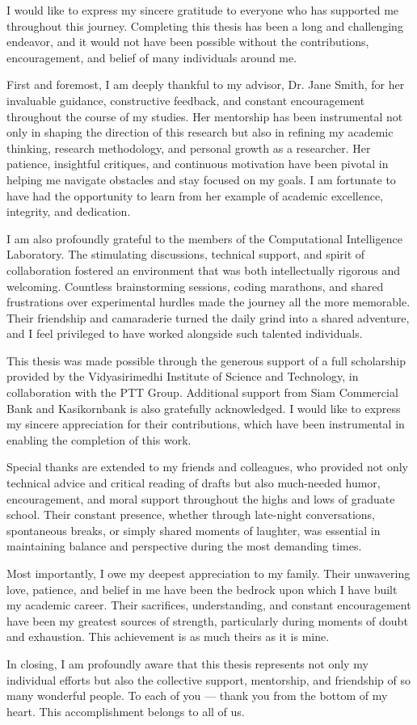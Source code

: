 I would like to express my sincere gratitude to everyone who has supported me throughout this journey. Completing this thesis has been a long and challenging endeavor, and it would not have been possible without the contributions, encouragement, and belief of many individuals around me.

First and foremost, I am deeply thankful to my advisor, Dr. Jane Smith, for her invaluable guidance, constructive feedback, and constant encouragement throughout the course of my studies. Her mentorship has been instrumental not only in shaping the direction of this research but also in refining my academic thinking, research methodology, and personal growth as a researcher. Her patience, insightful critiques, and continuous motivation have been pivotal in helping me navigate obstacles and stay focused on my goals. I am fortunate to have had the opportunity to learn from her example of academic excellence, integrity, and dedication.

I am also profoundly grateful to the members of the Computational Intelligence Laboratory. The stimulating discussions, technical support, and spirit of collaboration fostered an environment that was both intellectually rigorous and welcoming. Countless brainstorming sessions, coding marathons, and shared frustrations over experimental hurdles made the journey all the more memorable. Their friendship and camaraderie turned the daily grind into a shared adventure, and I feel privileged to have worked alongside such talented individuals.

This thesis was made possible through the generous support of a full scholarship provided by the Vidyasirimedhi Institute of Science and Technology, in collaboration with the PTT Group. Additional support from Siam Commercial Bank and Kasikornbank is also gratefully acknowledged. I would like to express my sincere appreciation for their contributions, which have been instrumental in enabling the completion of this work.

Special thanks are extended to my friends and colleagues, who provided not only technical advice and critical reading of drafts but also much-needed humor, encouragement, and moral support throughout the highs and lows of graduate school. Their constant presence, whether through late-night conversations, spontaneous breaks, or simply shared moments of laughter, was essential in maintaining balance and perspective during the most demanding times.

Most importantly, I owe my deepest appreciation to my family. Their unwavering love, patience, and belief in me have been the bedrock upon which I have built my academic career. Their sacrifices, understanding, and constant encouragement have been my greatest sources of strength, particularly during moments of doubt and exhaustion. This achievement is as much theirs as it is mine.

In closing, I am profoundly aware that this thesis represents not only my individual efforts but also the collective support, mentorship, and friendship of so many wonderful people. To each of you — thank you from the bottom of my heart. This accomplishment belongs to all of us.
